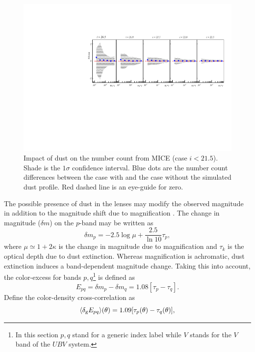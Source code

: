 \begin{figure}
\includegraphics[width=\textwidth,trim={0 2.3cm 0 3.5cm},clip]{./figures/mag_idust.pdf}
\caption{Impact of dust on the number count from MICE (case $i<21.5$). Shade is the $1\sigma$ confidence interval. Blue dots are the number count differences between the case with and the case without the simulated dust profile. Red dashed line is an eye-guide for zero.}
\label{fig:micedust}
\end{figure}
The possible presence of dust in the lenses may modify the observed magnitude in addition to the magnitude shift due to magnification \cite{2010MNRAS.405.1025M}. The change in magnitude ($\delta m$) on the $p$-band may be written as
\begin{equation}
\delta m_p = -2.5\log\mu+\frac{2.5}{\ln10}\tau_p,
\end{equation}
where  $\mu\simeq1+2\kappa$ is the change in magnitude due to magnification and $\tau_k$ is the optical depth due to dust extinction. Whereas magnification is achromatic, dust extinction induces a band-dependent magnitude change. Taking this into account, the color-excess for bands $p,q$\footnote{In this section $p,q$ stand for a generic index label while $V$ stands for the $V$ band of the $UBV$ system.} is defined as
\begin{equation}
E_{pq} = \delta m_p-\delta m_q=1.08[\tau_p-\tau_q].
\end{equation}
Define the color-density cross-correlation as \cite{2010MNRAS.405.1025M}
\begin{equation}
\langle \delta_{\rm g}E_{pq}\rangle(\theta) = 1.09[\tau_p(\theta)-\tau_q(\theta)],
\end{equation}
